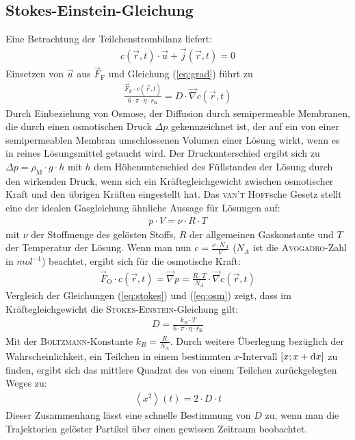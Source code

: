 \documentclass[numbers=noenddot,12pt,a4paper]{scrartcl}
\newcommand{\diff}{\textnormal{d}}
\newcommand{\ix}[1]{_\text{#1}}
\begin{document}
\subsection{Stokes-Einstein-Gleichung}
Eine Betrachtung der Teilchenstrombilanz liefert:
\begin{align}
c(\vec{r},t)\cdot\vec{u}+\vec{j}(\vec{r},t)=0
\end{align}
Einsetzen von $\vec{u}$ aus $\vec{F}\ix{F}$ und Gleichung (\ref{eq:grad}) führt zu
\begin{align}
\frac{\vec{F}\ix{F}\cdot c(\vec{r},t)}{6\cdot\pi\cdot\eta\cdot r\ix{K}}=D\cdot\vec{\nabla}c(\vec{r},t)\label{eq:stokes}
\end{align}
Durch Einbeziehung von Osmose, der Diffusion durch semipermeable Membranen, die durch einen osmotischen Druck $\Delta p$ gekennzeichnet ist, der auf ein von einer semipermeablen Membran umschlossenen Volumen einer Lösung wirkt, wenn es in reines Lösungsmittel getaucht wird. Der Druckunterschied ergibt sich zu $\Delta p=\rho\ix{M}\cdot g\cdot h$ mit $h$ dem Höhenunterschied des Füllstandes der Lösung durch den wirkenden Druck, wenn sich ein Kräftegleichgewicht zwischen osmotischer Kraft und den übrigen Kräften eingestellt hat. Das \textsc{van't Hoff}sche Gesetz stellt eine der idealen Gasgleichung ähnliche Aussage für Lösungen auf:
\begin{align}
p\cdot V=\nu\cdot R\cdot T
\end{align}
mit $\nu$ der Stoffmenge des gelösten Stoffs, $R$ der allgemeinen Gaskonstante und $T$ der Temperatur der Lösung. Wenn man nun $c=\frac{\nu\cdot N_A}{V}$ ($N_A$ ist die \textsc{Avogadro}-Zahl in $\unit{mol^{-1}}$) beachtet, ergibt sich für die osmotische Kraft:
\begin{align}
\vec{F}\ix{O}\cdot c(\vec{r},t)=\vec{\nabla} p=\frac{R\cdot T}{N_A}\cdot\vec{\nabla} c(\vec{r},t)\label{eq:osm}
\end{align}
Vergleich der Gleichungen (\ref{eq:stokes}) und (\ref{eq:osm}) zeigt, dass im Kräftegleichgewicht die \textsc{Stokes}-\textsc{Einstein}-Gleichung gilt:
\begin{align}
D=\frac{k_B\cdot T}{6\cdot\pi\cdot\eta\cdot r\ix{K}}\label{eq:esgle}
\end{align}
Mit der \textsc{Boltzmann}-Konstante $k_B=\frac{R}{N_A}$. Durch weitere Überlegung bezüglich der Wahrscheinlichkeit, ein Teilchen in einem bestimmten $x$-Intervall $\left[x;x+\diff x\right]$ zu finden, ergibt sich das mittlere Quadrat des von einem Teilchen zurückgelegten Weges zu:
\begin{align}
\left\langle x^2 \right\rangle(t)=2\cdot D\cdot t\label{eq:x2D}
\end{align}
Dieser Zusammenhang lässt eine schnelle Bestimmung von $D$ zu, wenn man die Trajektorien gelöster Partikel über einen gewissen Zeitraum beobachtet.
\newpage
\end{document}
